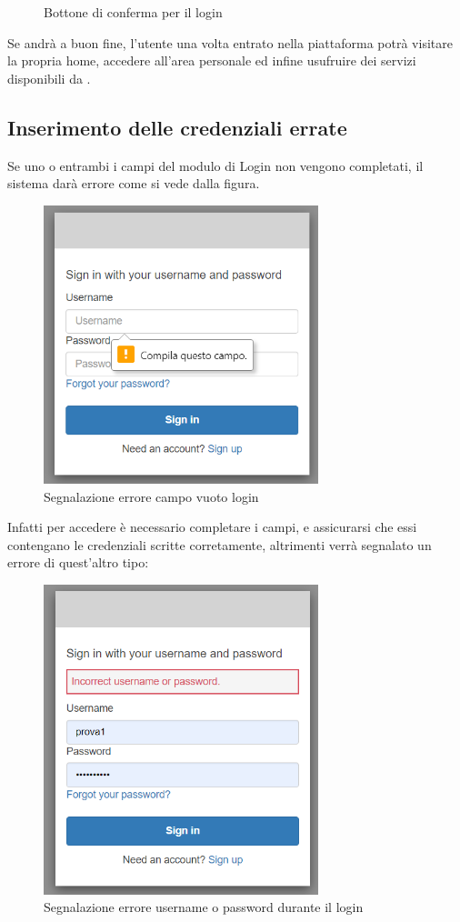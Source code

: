 {{\begin{figure}[H]
            \centering
            \caption{Bottone di conferma per il login}
        \end{figure}
        Se andrà a buon fine, l'utente una volta entrato nella piattaforma potrà visitare la propria home, accedere all'area personale ed infine usufruire dei servizi disponibili da \platform.
    \subsection{Inserimento delle credenziali errate} {
            Se uno o entrambi i campi del modulo di Login non vengono completati, il sistema darà errore come si vede dalla figura. 
            \begin{figure}[H]
                \includegraphics[width=8cm]{sezioni/images/err-vuoto-log.png}
                \centering
                \caption{Segnalazione errore campo vuoto login}
            \end{figure}
            Infatti per accedere è necessario completare i campi, e assicurarsi
            che essi contengano le credenziali scritte corretamente, altrimenti verrà segnalato un errore di quest'altro tipo: 
            \begin{figure}[H]
                \includegraphics[width=8cm]{sezioni/images/err-log.png}
                \centering
                \caption{Segnalazione errore username o password durante il login}
            \end{figure}
            }   
    }

}
